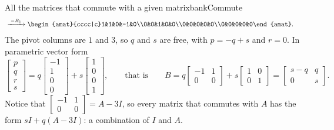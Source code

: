 \documentclass[11pt]{article}
\begin{document}
\begin{exmp}{All the matrices that commute with a given matrix}{bankCommute}
\begin{align*}
&\rops{-R_1}
\begin{amat}{cccc|c}1&1&0&-1&0\\0&0&1&0&0\\0&0&0&0&0\\0&0&0&0&0\end{amat}.
\end{align*}
The pivot columns are $1$ and $3$, so $q$ and $s$ are free, with $p=-q+s$ and $r=0$. In parametric vector form
\[
\begin{bmatrix}p\\q\\r\\s\end{bmatrix}=q\begin{bmatrix}-1\\1\\0\\0\end{bmatrix}+s\begin{bmatrix}1\\0\\0\\1\end{bmatrix},\qquad\text{that is}\qquad B=q\begin{bmatrix}-1&1\\0&0\end{bmatrix}+s\begin{bmatrix}1&0\\0&1\end{bmatrix}=\begin{bmatrix}s-q&q\\0&s\end{bmatrix}.
\]
Notice that $\begin{bmatrix}-1&1\\0&0\end{bmatrix}=A-3I$, so every matrix that commutes with $A$ has the form $sI+q(A-3I)$: a combination of $I$ and $A$.


\end{exmp}
\end{document}
